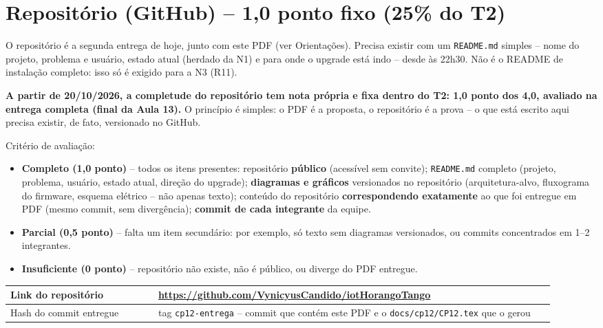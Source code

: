 \documentclass[11pt,a4paper]{article}
\newcommand{\cod}[1]{\texttt{#1}}
\begin{document}
\section{Repositório (GitHub) -- 1,0 ponto fixo (25\% do T2)}

O repositório é a segunda entrega de hoje, junto com este PDF (ver Orientações). Precisa
existir com um \cod{README.md} simples -- nome do projeto, problema e usuário, estado atual
(herdado da N1) e para onde o upgrade está indo -- desde às 22h30. Não é o README de
instalação completo: isso só é exigido para a N3 (R11).

\textbf{A partir de 20/10/2026, a completude do repositório tem nota própria e fixa
dentro do T2: 1,0 ponto dos 4,0, avaliado na entrega completa (final da Aula 13).}
O princípio é simples: o PDF é a proposta, o repositório é a prova -- o que está escrito aqui
precisa existir, de fato, versionado no GitHub.

Critério de avaliação:

\begin{itemize}
\item \textbf{Completo (1,0 ponto)} -- todos os itens presentes: repositório \textbf{público} (acessível
  sem convite); \cod{README.md} completo (projeto, problema, usuário, estado atual, direção
  do upgrade); \textbf{diagramas e gráficos} versionados no repositório (arquitetura-alvo, fluxograma do firmware, esquema elétrico -- não apenas texto); conteúdo do repositório
  \textbf{correspondendo exatamente} ao que foi entregue em PDF (mesmo commit, sem
  divergência); \textbf{commit de cada integrante} da equipe.
\item \textbf{Parcial (0,5 ponto)} -- falta um item secundário: por exemplo, só texto sem diagramas
  versionados, ou commits concentrados em 1--2 integrantes.
\item \textbf{Insuficiente (0 ponto)} -- repositório não existe, não é público, ou diverge do PDF
  entregue.
\end{itemize}

\begin{longtable}{|p{0.25\linewidth}|p{0.67\linewidth}|}
\hline
Link do repositório & \url{https://github.com/VynicyusCandido/iotHorangoTango} \\ \hline
Hash do commit entregue & tag \cod{cp12-entrega} -- commit que contém este PDF e o \cod{docs/cp12/CP12.tex} que o gerou \\ \hline
\end{longtable}
\end{document}
